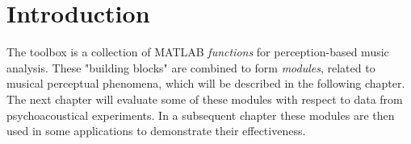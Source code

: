 
\chapter{Introduction}

The toolbox is a collection of MATLAB \emph{functions} for
perception-based music analysis. These "building blocks" are
combined to form \emph{modules}, related to musical perceptual
phenomena, which will be described in the following chapter. The
next chapter will evaluate some of these modules with respect to
data from psychoacoustical experiments. In a subsequent chapter
these modules are then used in some applications to demonstrate
their effectiveness.

